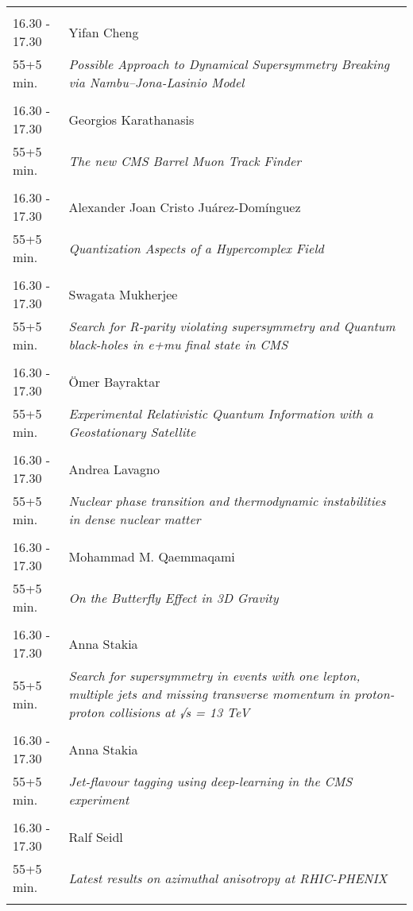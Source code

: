 \begin{longtable}{p{3cm}p{13cm}}
 & \\ 
16.30 - 17.30 & Yifan Cheng\\ 
55+5 min. & {\it Possible Approach to Dynamical Supersymmetry Breaking via Nambu--Jona-Lasinio Model}\\ 
 & \\ 
16.30 - 17.30 & Georgios Karathanasis\\ 
55+5 min. & {\it The new CMS Barrel Muon Track Finder}\\ 
 & \\ 
16.30 - 17.30 & Alexander Joan Cristo Juárez-Domínguez\\ 
55+5 min. & {\it Quantization Aspects of a Hypercomplex Field}\\ 
 & \\ 
16.30 - 17.30 & Swagata Mukherjee\\ 
55+5 min. & {\it Search for R-parity violating supersymmetry and Quantum black-holes in e+mu final state in CMS}\\ 
 & \\ 
16.30 - 17.30 & Ömer Bayraktar\\ 
55+5 min. & {\it Experimental Relativistic Quantum Information with a Geostationary Satellite}\\ 
 & \\ 
16.30 - 17.30 & Andrea Lavagno\\ 
55+5 min. & {\it Nuclear phase transition and thermodynamic instabilities in dense nuclear matter}\\ 
 & \\ 
16.30 - 17.30 & Mohammad M. Qaemmaqami\\ 
55+5 min. & {\it On the Butterfly Effect in 3D Gravity}\\ 
 & \\ 
16.30 - 17.30 & Anna Stakia\\ 
55+5 min. & {\it Search for supersymmetry in events with one lepton, multiple jets and missing transverse momentum in proton-proton collisions at √s = 13 TeV}\\ 
 & \\ 
16.30 - 17.30 & Anna Stakia\\ 
55+5 min. & {\it Jet-flavour tagging using deep-learning in the CMS experiment}\\ 
 & \\ 
16.30 - 17.30 & Ralf Seidl\\ 
55+5 min. & {\it Latest results on azimuthal anisotropy at RHIC-PHENIX}\\ 
 & \\ 

\end{longtable}
